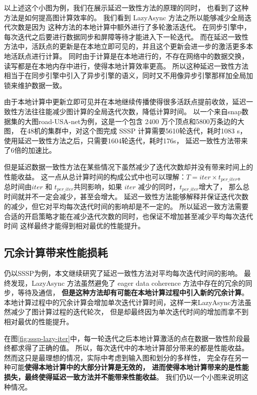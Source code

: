 以上述这个小图为例，我们在展示延迟一致性方法的原理的同时，
也看到了这种方法是如何提高图计算效率的。
我们看到 LazyAsync 方法之所以能够减少全局迭代次数是因为
这种方法的本地计算中额外进行了多轮激活迭代。
在同步引擎中，每次迭代之后要进行数据同步和屏障等待才能进入下一轮迭代。
而在延迟一致性方法中，活跃点的更新是在本地立即可见的，并且这个更新会进一步的激活更多本地活跃点进行计算。
同时由于计算是在本地进行的，不存在网络中的数据交换，读写都是在本地内存中进行，使得本地计算效率更高。
所以这种延迟一致性方法相当于在同步引擎中引入了异步引擎的语义\cite{Ju@MACS17}，同时又不用像异步引擎那样加全局加锁来维护数据一致\cite{Xie@PPoPP15}。

由于本地计算中更新立即可见并在本地继续传播使得很多活跃点提前收敛，延迟一致性方法往往能减少图计算的全局迭代次数，降低计算时间。
以一个来自snap\cite{SNAP}数据集的大图road-USA-net为例，这是一个包含 2400 万个顶点和5800万条边的大图，
在48机的集群中，对这个图完成 SSSP 计算需要5610轮迭代，耗时1083 s， 使用延迟一致性方法之后，只需要1604轮迭代，耗时176s，
延迟一致性方法带来了6倍的加速比。

但是延迟数据一致性方法在某些情况下虽然减少了迭代次数却并没有带来时间上的性能收益。
这一点从总计算时间的构成公式\cite{bsp@1990}中也可以理解：$T=iter \times t_{per\_iter}$。
总时间由$iter$ 和 $t_{per\_iter}$共同影响，如果 $iter$ 减少的同时，$t_{per\_iter}$增大了，
那么总时间就并不一定会减少，甚至会增大。
延迟一致性方法能够解释并保证迭代次数的减少，但它对平均每次迭代时间的影响却是不一定的。
所以延迟一致方法需要合适的开启策略才能在减少迭代次数的同时，也保证不增加甚至减少平均每次迭代时间
这样最终才能得到相对最优的性能提升。

\subsection{冗余计算带来性能损耗}
仍以SSSP为例，本文继续研究了延迟一致性方法对平均每次迭代时间的影响。
最终发现，LazyAsync 方法虽然避免了 eager data coherence 方法中存在的冗余的同步，等待及通信，
\textbf{但是这种方法却有可能在本地计算过程中引入新的冗余计算}。
本地计算过程中的冗余计算会增加单次迭代计算时间，这样一来LazyAsync方法虽然减少了图计算过程的迭代轮次，
但是却最终因为单次迭代时间的增加而拿不到相对最优的性能提升。


在图\ref{fig:sssp-lazy-iter}中，每一轮迭代之后本地计算激活的点在数据一致性阶段最终都求得了正确的值。
所以，每次迭代中的本地计算部分带来的都是性能收益。
然而这只是最理想的情况，实际中考虑到输入图和划分的多样性，
完全存在另一种可能\textbf{使得本地计算中的大部分计算是无效的，
进而使得本地计算带来的是性能损失，最终使得延迟一致方法并不能带来性能收益}。
我们仍以一个小图来说明这种情况。


